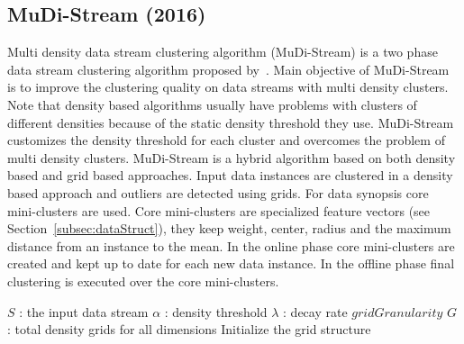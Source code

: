 \documentclass[smallcondensed]{svjour3}     %
\begin{document}
\subsection{MuDi-Stream (2016)} 
Multi density data stream clustering algorithm (MuDi-Stream) is a two phase data stream clustering algorithm proposed by~\citet{Amini:2016:MudiStream}. Main objective of MuDi-Stream is to improve the clustering quality on data streams with multi density clusters. Note that density based algorithms usually have problems with clusters of different densities because of the static density threshold they use. MuDi-Stream customizes the density threshold for each cluster and overcomes the problem of multi density clusters. MuDi-Stream is a hybrid algorithm based on both density based and grid based approaches. Input data instances are clustered in a density based approach and outliers are detected using grids. For data synopsis core mini-clusters are used. Core mini-clusters are specialized feature vectors (see Section~\ref{subsec:dataStruct}), they keep weight, center, radius and the maximum distance from an instance to the mean. In the online phase core mini-clusters are created and kept up to date for each new data instance. In the offline phase final clustering is executed over the core mini-clusters.

\begin{algorithm}
	\caption{MuDi-Stream online phase (S, $\alpha$, $\lambda$, $gridGranularity$, $G$)}
	\label{alg:mudiStreamOnline}
	\begin{algorithmic}[1]
		\Require $S$ : the input data stream
		\Require $\alpha$ : density threshold
		\Require $\lambda$ : decay rate
		\Require $gridGranularity$
		\Require $G$ : total density grids for all dimensions
		\State Initialize the grid structure
		
	\end{algorithmic}
\end{algorithm}
\end{document}
